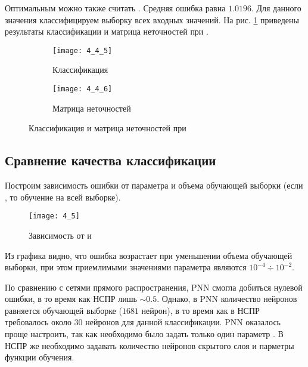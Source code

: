 Оптимальным можно также считать . Средняя ошибка равна $1.0196$. Для данного значения классифицируем выборку всех входных значений. На рис. \ref{fig:4_4_5} приведены результаты классификации и матрица неточностей при .
\begin{figure}[H]
\begin{center}
	\begin{subfigure}{0.49\textwidth}
		\texttt{[image: 4\_4\_5]}
		\caption{Классификация}
	\end{subfigure}
	\begin{subfigure}{0.49\textwidth}
		\texttt{[image: 4\_4\_6]}
		\caption{Матрица неточностей}
	\end{subfigure}
	\caption{Классификация и матрица неточностей при }
	\label{fig:4_4_5}
\end{center}
\end{figure}

\subsection{Сравнение качества классификации}


Построим зависимость ошибки  от параметра  и объема обучающей выборки  (если , то обучение на всей выборке). 
\begin{figure}[H]
\begin{center}
	\texttt{[image: 4\_5]}
	\caption{Зависимость  от  и }
	\label{fig:4_5}
\end{center}
\end{figure}
Из графика видно, что ошибка возрастает при уменьшении объема обучающей выборки, при этом приемлимыми значениями параметра  являются $10^{-4} \div 10^{-2}$.

По сравнению с сетями прямого распространения, PNN смогла добиться нулевой ошибки, в то время как НСПР лишь $\sim 0.5$. Однако, в PNN количество нейронов равняется обучающей выборке ($1681$ нейрон), в то время как в НСПР требовалось около $30$ нейронов для данной классификации. PNN оказалось проще настроить, так как необходимо было задать только один параметр . В НСПР же необходимо задавать количество нейронов скрытого слоя и парметры функции обучения.

